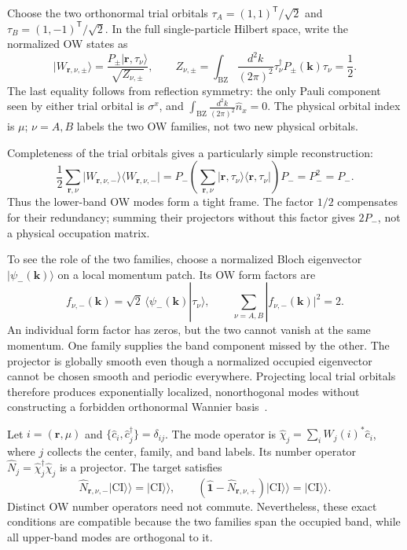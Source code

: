\documentclass[aps,prb,onecolumn,nofootinbib,superscriptaddress]{revtex4-2}
\newcommand{\bk}{\boldsymbol k}
\newcommand{\br}{\boldsymbol r}
\newcommand{\ket}[1]{\lvert#1\rangle}
\newcommand{\bra}[1]{\langle#1\rvert}
\newcommand{\kett}[1]{\lvert#1\rangle\!\rangle}
\newcommand{\intk}{\int_{\mathrm{BZ}}\frac{d^2k}{(2\pi)^2}}
\begin{document}
Choose the two orthonormal trial orbitals
$\tau_A=(1,1)^{\mathsf T}/\sqrt2$ and
$\tau_B=(1,-1)^{\mathsf T}/\sqrt2$. In the full single-particle Hilbert space,
write the normalized OW states as
\begin{equation}
 \ket{W_{\br,\nu,\pm}}=
 \frac{P_\pm\ket{\br,\tau_\nu}}{\sqrt{Z_{\nu,\pm}}},\qquad
 Z_{\nu,\pm}=\intk\tau_\nu^\dagger P_\pm(\bk)\tau_\nu=\frac12.
 \label{eq:ow}
\end{equation}
The last equality follows from reflection symmetry: the only Pauli component
seen by either trial orbital is $\sigma^x$, and
$\intk\widehat n_x=0$. The physical orbital index is $\mu$; $\nu=A,B$
labels the two OW families, not two new physical orbitals.

Completeness of the trial orbitals gives a particularly simple reconstruction:
\begin{equation}
 \frac12\sum_{\br,\nu}\ket{W_{\br,\nu,-}}\bra{W_{\br,\nu,-}}
 =P_-\left(\sum_{\br,\nu}\ket{\br,\tau_\nu}\bra{\br,\tau_\nu}\right)P_-
 =P_-^2=P_-.
 \label{eq:tight}
\end{equation}
Thus the lower-band OW modes form a tight frame. The factor $1/2$ compensates
for their redundancy; summing their projectors without this factor gives
$2P_-$, not a physical occupation matrix.

To see the role of the two families, choose a normalized Bloch eigenvector
$\ket{\psi_-(\bk)}$ on a local momentum patch. Its OW form factors are
\begin{equation}
 f_{\nu,-}(\bk)=\sqrt2\,\langle\psi_-(\bk)|\tau_\nu\rangle,
 \qquad \sum_{\nu=A,B}|f_{\nu,-}(\bk)|^2=2.
 \label{eq:two-families}
\end{equation}
An individual form factor has zeros, but the two cannot vanish at the same
momentum. One family supplies the band component missed by the other. The
projector is globally smooth even though a normalized occupied eigenvector
cannot be chosen smooth and periodic everywhere. Projecting local trial
orbitals therefore produces exponentially localized, nonorthogonal modes
without constructing a forbidden orthonormal Wannier basis~\cite{Li2024}.

Let $i=(\br,\mu)$ and $\{\hat c_i,\hat c_j^\dagger\}=\delta_{ij}$.
The mode operator is $\hat\chi_j=\sum_i W_j(i)^*\hat c_i$, where $j$ collects
the center, family, and band labels. Its number operator
$\hat N_j=\hat\chi_j^\dagger\hat\chi_j$ is a projector. The target satisfies
\begin{equation}
 \hat N_{\br,\nu,-}\kett{\mathrm{CI}}=\kett{\mathrm{CI}},\qquad
 (\hat{\mathbf{1}}-\hat N_{\br,\nu,+})\kett{\mathrm{CI}}=\kett{\mathrm{CI}}.
 \label{eq:stabilizers}
\end{equation}
Distinct OW number operators need not commute. Nevertheless, these exact
conditions are compatible because the two families span the occupied band,
while all upper-band modes are orthogonal to it.
\end{document}
